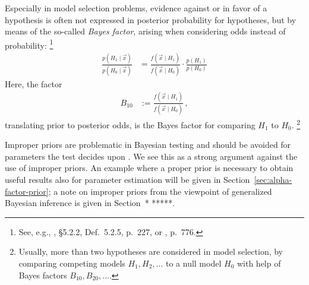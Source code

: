 Especially in model selection problems, evidence against or in favor of a hypothesis
is often not expressed in posterior probability for hypotheses, but by means of the so-called \emph{Bayes factor},
arising when considering odds instead of probability:%
\footnote{See, e.g., \textcite{2007:robert}, \S 5.2.2, Def.~5.2.5, p.~227, or \textcite{1995:kass-raftery}, p.~776.}
\begin{align*}
\frac{p(H_1\mid\vec{x})}{p(H_0\mid\vec{x})} &= \frac{f(\vec{x}\mid H_1)}{f(\vec{x}\mid H_0)} \cdot \frac{p(H_1)}{p(H_0)}
\end{align*}
Here, the factor
\begin{align*}
B_{10} &:= \frac{f(\vec{x}\mid H_1)}{f(\vec{x}\mid H_0)}\,,
\end{align*}
translating prior to posterior odds, is the Bayes factor for comparing $H_1$ to $H_0$.%
\footnote{Usually, more than two hypotheses are considered in model selection,
by comparing competing models $H_1, H_2, \ldots$ to a null model $H_0$
with help of Bayes factors $B_{10}, B_{20}, \ldots$.}

Improper priors are problematic in Bayesian testing \parencite[\S 5.2.5]{2007:robert}
and should be avoided for parameters the test decides upon \parencite[p.~782]{1995:kass-raftery}.
We see this as a strong argument against the use of improper priors.
An example where a proper prior is necessary to obtain useful results also for parameter estimation
will be given in Section~\ref{sec:alpha-factor-prior};
a note on improper priors from the viewpoint of generalized Bayesian inference is given in Section~* *****.
\iffalse
\cite[p.~235f]{2007:robert}
\begin{quote}
The difficulties encountered with noninformative priors in testing
also point out that a testing problem cannot be treated in a coherent way if no prior information is available,
that is, that the information brought by the observations alone is usually not enough
to infer about the truth of a hypothesis in categorical fashion (\emph{yes}/\emph{no}).
This obviously reinforces the the motivation for a Bayesian treatment of such testing problems,
since it is the only coherent approach taking advantage of the residual information.
\end{quote}
\fi




